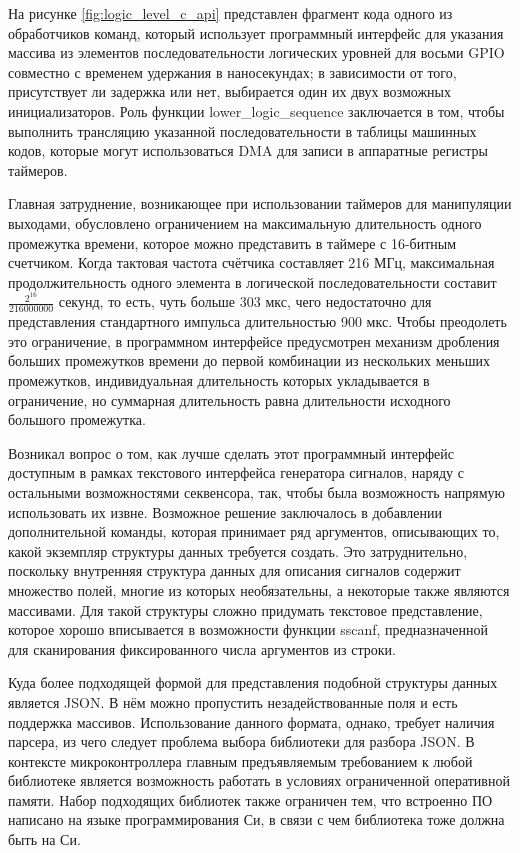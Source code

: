 \documentclass{report}
\begin{document}
На рисунке \ref{fig:logic_level_c_api} представлен фрагмент кода одного из обработчиков команд, который использует программный интерфейс для указания массива из элементов последовательности логических уровней для восьми GPIO совместно с временем удержания в наносекундах; в зависимости от того, присутствует ли задержка или нет, выбирается один их двух возможных инициализаторов. Роль функции lower\_logic\_sequence заключается в том, чтобы выполнить трансляцию указанной последовательности в таблицы машинных кодов, которые могут использоваться DMA для записи в аппаратные регистры таймеров.


Главная затруднение, возникающее при использовании таймеров для манипуляции выходами, обусловлено ограничением на максимальную длительность одного промежутка времени, которое можно представить в таймере с 16-битным счетчиком. Когда тактовая частота счётчика составляет 216 МГц, максимальная продолжительность одного элемента в логической последовательности составит $\frac{2^{16}}{216000000}$ секунд, то есть, чуть больше 303 мкс, чего недостаточно для представления стандартного импульса длительностью 900 мкс. Чтобы преодолеть это ограничение, в программном интерфейсе предусмотрен механизм дробления больших промежутков времени до первой комбинации из нескольких меньших промежутков, индивидуальная длительность которых укладывается в ограничение, но суммарная длительность равна длительности исходного большого промежутка.

Возникал вопрос о том, как лучше сделать этот программный интерфейс доступным в рамках текстового интерфейса генератора сигналов, наряду с остальными возможностями секвенсора, так, чтобы была возможность напрямую использовать их извне. Возможное решение заключалось в добавлении дополнительной команды, которая принимает ряд аргументов, описывающих то, какой экземпляр структуры данных требуется создать. Это затруднительно, поскольку внутренняя структура данных для описания сигналов содержит множество полей, многие из которых необязательны, а некоторые также являются массивами. Для такой структуры сложно придумать текстовое представление, которое хорошо вписывается в возможности функции sscanf, предназначенной для сканирования фиксированного числа аргументов из строки.

Куда более подходящей формой для представления подобной структуры данных является JSON. В нём можно пропустить незадействованные поля и есть поддержка массивов. Использование данного формата, однако, требует наличия парсера, из чего следует проблема выбора библиотеки для разбора JSON. В контексте микроконтроллера главным предъявляемым требованием к любой библиотеке является возможность работать в условиях ограниченной оперативной памяти. Набор подходящих библиотек также ограничен тем, что встроенно ПО написано на языке программирования Си, в связи с чем библиотека тоже должна быть на Си.
\end{document}

